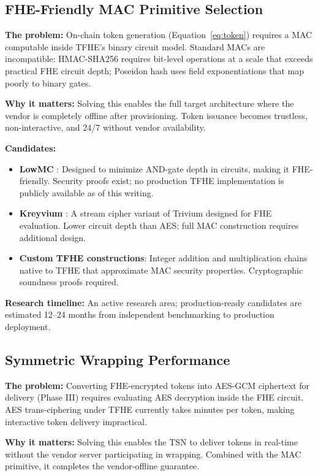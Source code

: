 \documentclass[conference]{IEEEtran}
\begin{document}
\subsection{FHE-Friendly MAC Primitive Selection}

\textbf{The problem:} On-chain token generation (Equation~\ref{eq:token}) requires
a MAC computable inside TFHE's binary circuit model. Standard MACs are incompatible:
HMAC-SHA256 requires bit-level operations at a scale that exceeds practical FHE
circuit depth; Poseidon hash uses field exponentiations that map poorly to binary gates.

\textbf{Why it matters:} Solving this enables the full target architecture where the
vendor is completely offline after provisioning. Token issuance becomes trustless,
non-interactive, and 24/7 without vendor availability.

\textbf{Candidates:}
\begin{itemize}
\item \textbf{LowMC} \cite{lowmc}: Designed to minimize AND-gate depth in circuits,
      making it FHE-friendly. Security proofs exist; no production TFHE implementation
      is publicly available as of this writing.
\item \textbf{Kreyvium} \cite{kreyvium}: A stream cipher variant of Trivium designed
      for FHE evaluation. Lower circuit depth than AES; full MAC construction requires
      additional design.
\item \textbf{Custom TFHE constructions}: Integer addition and multiplication chains
      native to TFHE that approximate MAC security properties. Cryptographic soundness
      proofs required.
\end{itemize}

\textbf{Research timeline:} An active research area; production-ready candidates are
estimated 12--24 months from independent benchmarking to production deployment.

\subsection{Symmetric Wrapping Performance}

\textbf{The problem:} Converting FHE-encrypted tokens into AES-GCM ciphertext for
delivery (Phase III) requires evaluating AES decryption inside the FHE circuit.
AES trans-ciphering under TFHE currently takes minutes per token, making interactive
token delivery impractical.

\textbf{Why it matters:} Solving this enables the TSN to deliver tokens in real-time
without the vendor server participating in wrapping. Combined with the MAC primitive,
it completes the vendor-offline guarantee.
\end{document}
